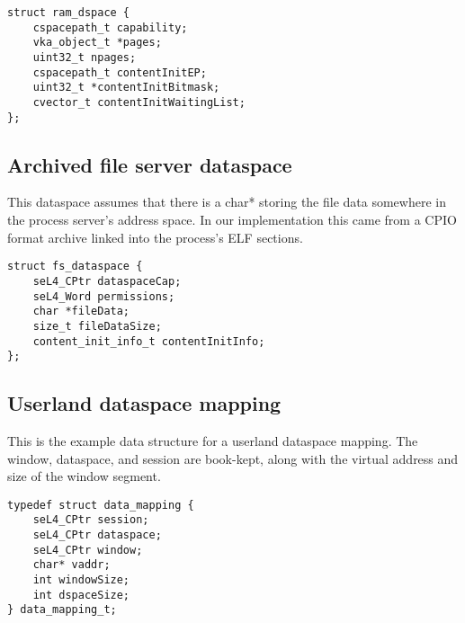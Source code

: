 \begin{verbatim}
struct ram_dspace {
    cspacepath_t capability;
    vka_object_t *pages;
    uint32_t npages;
    cspacepath_t contentInitEP;
    uint32_t *contentInitBitmask;
    cvector_t contentInitWaitingList;
};
\end{verbatim}

\subsection {Archived file server dataspace}

This dataspace assumes that there is a char* storing the file data somewhere in the process server's
address space. In our implementation this came from a CPIO format archive linked into the process's
ELF sections.

\begin{verbatim}
struct fs_dataspace {
    seL4_CPtr dataspaceCap;
    seL4_Word permissions;
    char *fileData;
    size_t fileDataSize;
    content_init_info_t contentInitInfo;
};
\end{verbatim}

\subsection {Userland dataspace mapping}

This is the example data structure for a userland dataspace mapping. The window, dataspace, and
session are book-kept, along with the virtual address and size of the window segment.

\begin{verbatim}
typedef struct data_mapping {
    seL4_CPtr session;
    seL4_CPtr dataspace;
    seL4_CPtr window;
    char* vaddr;
    int windowSize;
    int dspaceSize;
} data_mapping_t;
\end{verbatim}
